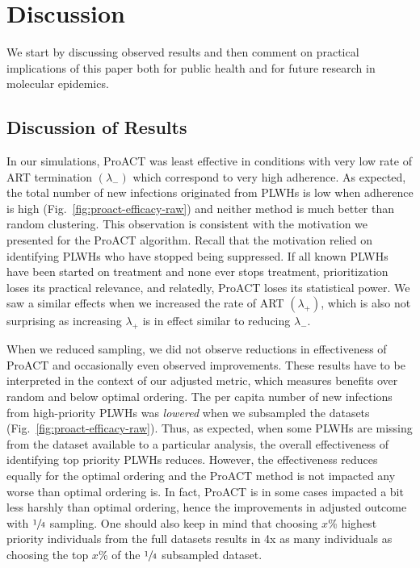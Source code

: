 \section{Discussion}
We start by discussing observed results and then comment on practical implications of this paper both for public health and for future research in molecular epidemics. 

\subsection{Discussion of Results}
In our simulations, ProACT was least effective in conditions with very low rate of \gls{ART} termination $(\lambda_{-})$ which correspond to very high adherence. As expected, the total number of new infections originated from \glspl{PLWH} is low when adherence is high (Fig.~\ref{fig:proact-efficacy-raw}) and neither method is much better than random clustering. This observation is consistent with the motivation we presented for the ProACT algorithm. Recall that the motivation relied on identifying \glspl{PLWH} who have stopped being suppressed. If all known \glspl{PLWH} have been started on treatment and none ever stops treatment, prioritization loses its practical relevance, and relatedly, ProACT loses its statistical power. We saw a similar effects when we increased the rate of \gls{ART} $(\lambda_{+})$, which is also not surprising as increasing $\lambda_{+}$ is in effect similar to reducing $\lambda_{-}$.

When we reduced sampling, we did not observe reductions in effectiveness of ProACT and occasionally even observed improvements. These results have to be interpreted in the context of our adjusted metric, which measures benefits over random and below optimal ordering. The per capita number of new infections from high-priority \glspl{PLWH} was \textit{lowered} when we subsampled the datasets (Fig.~\ref{fig:proact-efficacy-raw}). Thus, as expected, when some \glspl{PLWH} are missing from the dataset available to a particular analysis, the overall effectiveness of identifying top priority \glspl{PLWH} reduces. However, the effectiveness reduces equally for the optimal ordering and the ProACT method is not impacted any worse than optimal ordering is. In fact, ProACT is in some cases impacted a bit less harshly than optimal ordering, hence the improvements in adjusted outcome with $\sfrac{1}{4}$ sampling. One should also keep in mind that choosing $x$\% highest priority individuals from the full datasets results in 4x as many individuals as choosing the top $x$\% of the $\sfrac{1}{4}$ subsampled dataset.

